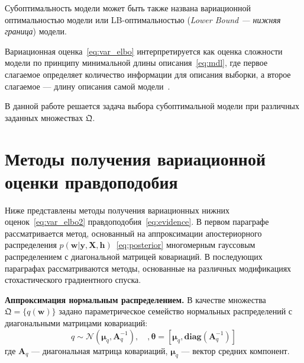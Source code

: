 {
Субоптимальность модели может быть также названа вариационной оптимальностью модели или LB-оптимальностью (\textit{Lower Bound --- нижняя граница}) модели.}

Вариационная оценка~\eqref{eq:var_elbo} интерпретируется как оценка сложности модели по принципу минимальной длины описания~\eqref{eq:mdl}, где первое слагаемое определяет количество информации для описания выборки, а второе слагаемое --- длину описания самой модели~\cite{nips}.

В данной работе решается задача выбора субоптимальной модели при различных заданных множествах $\mathfrak{Q}$.

\section{Методы получения вариационной оценки правдоподобия}
Ниже представлены методы получения вариационных нижних оценок~\eqref{eq:var_elbo2} правдоподобия~\eqref{eq:evidence}. В первом параграфе рассматривается метод, основанный на аппроксимации апостериорного распределения $p( \mathbf{w}|\mathbf{y}, \mathbf{X}, \mathbf{h})$~\eqref{eq:posterior} многомерным гауссовым распределением с диагональной матрицей ковариаций. В последующих параграфах рассматриваются методы, основанные на различных модификациях стохастического градиентного спуска. 

\textbf{Аппроксимация нормальным распределением. }
В качестве множества $\mathfrak{Q} = \{q(\mathbf{w})\}$ задано параметрическое семейство нормальных распределений с диагональными матрицами ковариаций:
\begin{equation}
\label{eq:diag}
	q \sim \mathcal{N}(\boldsymbol{\mu}_q, \mathbf{A}^{-1}_q),\quad,\boldsymbol{\theta}=[\boldsymbol{\mu}_q, \textbf{diag}(\mathbf{A}^{-1}_q)]
\end{equation}
где $\mathbf{A}_q$ --- диагональная матрица ковариаций, $\boldsymbol{\mu}_q$ --- вектор средних компонент.


